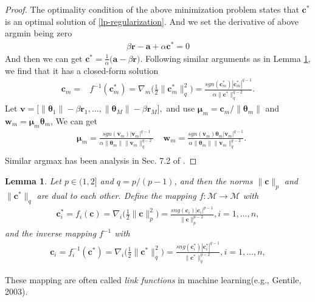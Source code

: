 \documentclass{article}
\newtheorem{lemma}{Lemma}
\begin{document}
\begin{proof}
The optimality condition of the above minimization problem\cite{rockafellar2015convex} states that $\pmb{c}^\ast$ is an optimal solution of \eqref{lp-regularization}. And we set the derivative of above argmin being zero
\begin{align}
    \label{l2-regularization-subgradient}
        \beta\mathbf{r}-\mathbf{a}+\alpha\pmb{c}^\ast=0
\end{align}
And then we can get $\pmb{c}^\ast=\frac{1}{\alpha}\Big(\mathbf{a}-\beta\mathbf{r}\Big)$.
Following similar arguments as in Lemma \ref{inverse-mapping}, we find that it has a closed-form solution
\begin{align*}
    \pmb{c}_m=&f ^{-1}(\pmb{c}_m^\ast)=\nabla_m\Big(\frac{1}{2}\|\pmb{c}_m^\ast\|_q^2\Big)
    =\frac{sgn(\pmb{c}_m^\ast)|\pmb{c}_m^\ast|^{q-1}}{\alpha\|\pmb{c}^\ast\|_q^{q-2}}.
\end{align*}
Let
$
    \pmb{v}=\Big[\|\pmb{\theta}_1\|-\beta\mathbf{r}_1,\ldots,
    \|\pmb{\theta}_M\|-\beta\mathbf{r}_M\Big],
$
and use $\pmb{\mu}_m=\pmb{c}_m/\|\pmb{\theta}_m\|$ and $\pmb{w}_m=\pmb{\mu}_m\pmb{\theta}_m$, We can get
\begin{align*}
    &\pmb{\mu}_m=\frac{sgn(\pmb{v}_m)|\pmb{v}_m|^{q-1}}{\alpha\|\pmb{\theta}_m\|\|\pmb{v}_m\|_q^{q-2}}\;
    &\pmb{w}_m=\frac{sgn(\pmb{v}_m)\pmb{\theta}_m|\pmb{v}_m|^{q-1}}{\alpha\|\pmb{\theta}_m\|\|\pmb{v}_m\|_q^{q-2}}.\\
\end{align*}
Similar argmax has been analysis in Sec. 7.2 of \cite{Xiao10}.
\end{proof}

\begin{lemma}
  \label{inverse-mapping}
  Let $p \in (1,2]$ and $q=p/(p-1)$, and then the norms $\|\pmb{c}\|_p$ and $\|\pmb{c}^\ast\|_q$ are dual to each other. Define the mapping $f:\mathcal{M} \to \mathcal{M}$ with
  \begin{align*}
    \pmb{c}^\ast_i=f_i(\pmb{c})=\nabla_i\Big(\frac{1}{2}\|\pmb{c}\|_p^2\Big)=\frac{sng(\pmb{c}_i)|\pmb{c}_i|^{p-1}}{\|\pmb{c}\|_p^{p-2}}, i=1,\ldots,n,
  \end{align*}
and the inverse mapping $f^{-1}$ with
  \begin{align*}
    \pmb{c}_i=f^{-1}_i(\pmb{c}^\ast)=\nabla_i\Big(\frac{1}{2}\|\pmb{c}^\ast\|_q^2\Big)=\frac{sng(\pmb{c}^\ast_i)|\pmb{c}^\ast_i|^{q-1}}{\|\pmb{c}^\ast\|_q^{q-2}}, i=1,\ldots,n,
  \end{align*}
\end{lemma}
These mapping are often called {\em link functions} in machine learning(e.g., Gentile, 2003).
\end{document}
